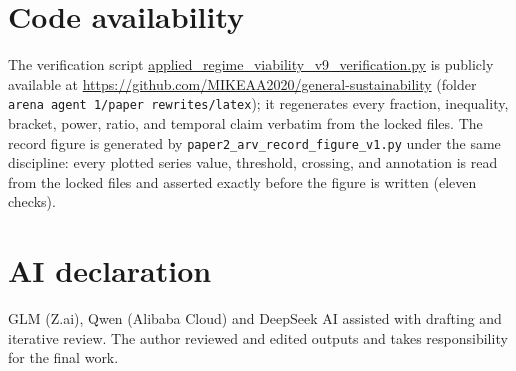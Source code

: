 \documentclass[10pt,twocolumn]{article}
\theoremstyle{plain}
\theoremstyle{remark}
\begin{document}
\section*{Code availability}
The verification script
\url{applied_regime_viability_v9_verification.py}
is publicly available at
\url{https://github.com/MIKEAA2020/general-sustainability} (folder
\texttt{arena agent 1/paper rewrites/latex}); it regenerates every
fraction, inequality, bracket, power, ratio, and temporal claim
verbatim from the locked files. The record figure is generated by
\texttt{paper2\_arv\_record\_figure\_v1.py} under the same discipline:
every plotted series value, threshold, crossing, and annotation is read
from the locked files and asserted exactly before the figure is written
(eleven checks).

\section*{AI declaration}
GLM (Z.ai), Qwen (Alibaba Cloud) and DeepSeek AI assisted with drafting
and iterative review. The author reviewed and edited outputs and takes
responsibility for the final work.
\end{document}
